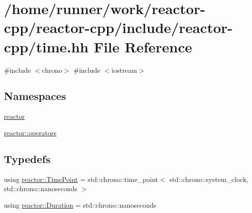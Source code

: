 \hypertarget{time_8hh}{}\section{/home/runner/work/reactor-\/cpp/reactor-\/cpp/include/reactor-\/cpp/time.hh File Reference}
\label{time_8hh}
{\ttfamily \#include $<$chrono$>$}\newline
{\ttfamily \#include $<$iostream$>$}\newline
\subsection*{Namespaces}
\begin{DoxyCompactItemize}
\item 
 \hyperlink{namespacereactor}{reactor}
\item 
 \hyperlink{namespacereactor_1_1operators}{reactor\+::operators}
\end{DoxyCompactItemize}
\subsection*{Typedefs}
\begin{DoxyCompactItemize}
\item 
using \hyperlink{namespacereactor_ad950f8d1a46612500286a4af0f167080}{reactor\+::\+Time\+Point} = std\+::chrono\+::time\+\_\+point$<$ std\+::chrono\+::system\+\_\+clock, std\+::chrono\+::nanoseconds $>$
\item 
using \hyperlink{namespacereactor_aa8375b807a80703545664096c5b5b779}{reactor\+::\+Duration} = std\+::chrono\+::nanoseconds
\end{DoxyCompactItemize}
